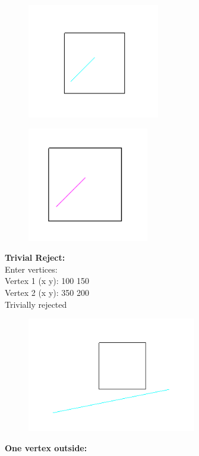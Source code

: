 \documentclass[9pt,letterpaper]{article}
\begin{document}
\begin{figure}[h]
    \centering
    \includegraphics[height=5cm]{Outputs/OP1.png}
\end{figure}
\begin{figure}[h]
    \centering
    \includegraphics[height=5cm]{Outputs/OP2.png}
\end{figure}

\newpage
\textbf{Trivial Reject:}\\

Enter vertices:  \\
Vertex 1 (x y): 100 150 \\
Vertex 2 (x y): 350 200 \\
Trivially rejected \\

\begin{figure}[h]
    \centering
    \includegraphics[height=5cm]{Outputs/OP3.png}
\end{figure}

\newpage
\textbf{\large{One vertex outside: }}\\
\end{document}

